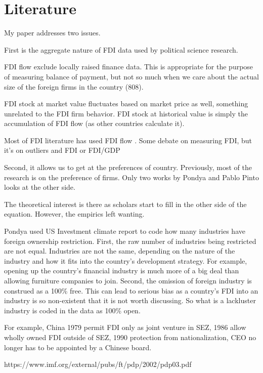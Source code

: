 \section{Literature}

My paper addresses two issues.

First is the aggregate nature of FDI data used by political science research.

FDI flow exclude locally raised finance data. This is appropriate for the purpose of measuring balance of payment, but not so much when we care about the actual size of the foreign firms in the country (808).

FDI stock at market value fluctuates based on market price as well, something unrelated to the FDI firm behavior. FDI stock at historical value is simply the accumulation of FDI flow (as other countries calculate it).

Most of FDI literature has used FDI flow \citep{Jensen2003, Ahlquist2006, Beazer2011, Graham2010}. Some debate on measuring FDI, but it's on outliers and FDI or FDI/GDP \citep{Li2009}

Second, it allows us to get at the preferences of country. Previously, most of the research is on the preference of firms. Only two works by Pondya and Pablo Pinto looks at the other side.

The theoretical interest is there as scholars start to fill in the other side of the equation. However, the empirics left wanting.

Pondya used US Investment climate report to code how many industries have foreign ownership restriction. First, the raw number of industries being restricted are not equal. Industries are not the same, depending on the nature of the industry and how it fits into the country's development strategy. For example, opening up the country's financial industry is much more of a big deal than allowing furniture companies to join. Second, the omission of foreign industry is construed as a 100\% free. This can lead to serious bias as a country's FDI into an industry is so non-existent that it is not worth discussing. So what is a lackluster industry is coded in the data as 100\% open.

For example, China 1979 permit FDI only as joint venture in SEZ, 1986 allow wholly owned FDI outside of SEZ, 1990 protection from nationalization, CEO no longer has to be appointed by a Chinese board.

https://www.imf.org/external/pubs/ft/pdp/2002/pdp03.pdf

